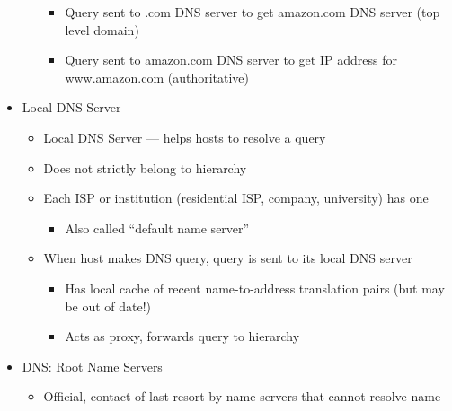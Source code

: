 \begin{itemize}
\begin{itemize}
\begin{itemize}
          \item Query sent to .com DNS server to get amazon.com DNS server (top level domain)

          \item Query sent to amazon.com DNS server to get IP address for www.amazon.com (authoritative)

        \end{itemize}

    \end{itemize}

  \item Local DNS Server

    \begin{itemize}

      \item Local DNS Server — helps hosts to resolve a query

      \item Does not strictly belong to hierarchy

      \item Each ISP or institution (residential ISP, company, university) has one

        \begin{itemize}

          \item Also called ``default name server''

        \end{itemize}

      \item When host makes DNS query, query is sent to its local DNS server

        \begin{itemize}

          \item Has local cache of recent name-to-address translation pairs (but may be out of date!)

          \item Acts as proxy, forwards query to hierarchy

        \end{itemize}

    \end{itemize}

  \item DNS: Root Name Servers

    \begin{itemize}

      \item Official, contact-of-last-resort by name servers that cannot resolve name


\end{itemize}
\end{itemize}
